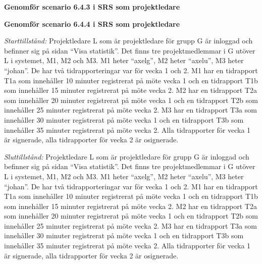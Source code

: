 \documentclass[a4paper]{article}
\begin{document}
\begin{ST}
\item
\textbf{Genomför scenario 6.4.3 i SRS som projektledare}

\item
\textbf{Genomför scenario 6.4.4 i SRS som projektledare}

\emph{Starttillstånd:} Projektledare L som är projektledare för grupp G är inloggad och befinner sig på sidan ``Visa statistik''. Det finns tre projektmedlemmar i G utöver L i systemet, M1, M2 och M3. M1 heter ``axelg'', M2 heter ``axelu'', M3 heter ``johan''. De har två tidrapporteringar var för vecka 1 och 2. M1 har en tidrapport T1a som innehåller 10 minuter registrerat på möte vecka 1 och en tidrapport T1b som innehåller 15 minuter registrerat på möte vecka 2. M2 har en tidrapport T2a som innehåller 20 minuter registrerat på möte vecka 1 och en tidrapport T2b som innehåller 25 minuter registrerat på möte vecka 2. M3 har en tidrapport T3a som innehåller 30 minuter registrerat på möte vecka 1 och en tidrapport T3b som innehåller 35 minuter registrerat på möte vecka 2. Alla tidrapporter för vecka 1 är signerade, alla tidrapporter för vecka 2 är osignerade.

\emph{Sluttillstånd:} Projektledare L som är projektledare för grupp G är inloggad och befinner sig på sidan ``Visa statistik''. Det finns tre projektmedlemmar i G utöver L i systemet, M1, M2 och M3. M1 heter ``axelg'', M2 heter ``axelu'', M3 heter ``johan''. De har två tidrapporteringar var för vecka 1 och 2. M1 har en tidrapport T1a som innehåller 10 minuter registrerat på möte vecka 1 och en tidrapport T1b som innehåller 15 minuter registrerat på möte vecka 2. M2 har en tidrapport T2a som innehåller 20 minuter registrerat på möte vecka 1 och en tidrapport T2b som innehåller 25 minuter registrerat på möte vecka 2. M3 har en tidrapport T3a som innehåller 30 minuter registrerat på möte vecka 1 och en tidrapport T3b som innehåller 35 minuter registrerat på möte vecka 2. Alla tidrapporter för vecka 1 är signerade, alla tidrapporter för vecka 2 är osignerade.


\end{ST}
\end{document}
